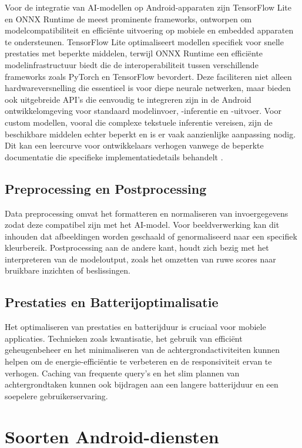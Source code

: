 Voor de integratie van AI-modellen op Android-apparaten zijn TensorFlow Lite en ONNX Runtime de meest prominente frameworks, ontworpen om modelcompatibiliteit en efficiënte uitvoering op mobiele en embedded apparaten te ondersteunen. TensorFlow Lite optimaliseert modellen specifiek voor snelle prestaties met beperkte middelen, terwijl ONNX Runtime een efficiënte modelinfrastructuur bie\-dt die de interoperabiliteit tussen verschillende frameworks zoals PyTorch en TensorFlow bevordert. Deze faciliteren niet alleen hardwareversnelling die essentieel is voor diepe neurale netwerken, maar bieden ook uitgebreide API's die eenvoudig te integreren zijn in de Android ontwikkelomgeving voor standaard modelinvoer, -inferentie en -uitvoer. Voor custom modellen, vooral die complexe tekstuele inferentie vereisen, zijn de beschikbare middelen echter beperkt en is er vaak aanzienlijke aanpassing nodig. Dit kan een leercurve voor ontwikkelaars verhogen vanwege de beperkte documentatie die specifieke implementatiedetails behandelt \autocite{Openja2022}.

\subsection{Preprocessing en Postprocessing}

Data preprocessing omvat het formatteren en normaliseren van invoergegevens zodat deze compatibel zijn met het AI-model. Voor beeldverwerking kan dit inhouden dat afbeeldingen worden geschaald of genormaliseerd naar een specifiek kleurbereik. Postprocessing aan de andere kant, houdt zich bezig met het interpreteren van de modeloutput, zoals het omzetten van ruwe scores naar bruikbare inzichten of beslissingen.

\subsection{Prestaties en Batterijoptimalisatie}

Het optimaliseren van prestaties en batterijduur is cruciaal voor mobiele applicaties. Technieken zoals kwantisatie, het gebruik van efficiënt geheugenbeheer en het minimaliseren van de achtergrondactiviteiten kunnen helpen om de energie-efficiëntie te verbeteren en de responsiviteit ervan te verhogen. Caching van frequente query's en het slim plannen van achtergrondtaken kunnen ook bijdragen aan een langere batterijduur en een soepelere gebruikerservaring.


\section{Soorten Android-diensten}

